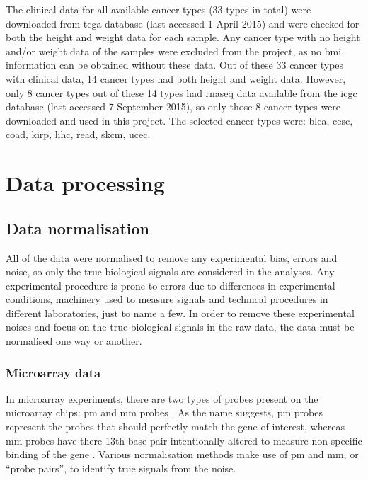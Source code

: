 \noindent
The clinical data for all available cancer types (33 types in total) were downloaded from \gls{tcga} database (last accessed 1 April 2015) and were checked for both the height and weight data for each sample.
Any cancer type with no height and/or weight data of the samples were excluded from the project, as no \gls{bmi} information can be obtained without these data.
Out of these 33 cancer types with clinical data, 14 cancer types had both height and weight data.
However, only 8 cancer types out of these 14 types had \gls{rnaseq} data available from the \gls{icgc} database (last accessed 7 September 2015), so only those 8 cancer types were downloaded and used in this project.
The selected cancer types were: \gls{blca}, \gls{cesc}, \gls{coad}, \gls{kirp}, \gls{lihc}, \gls{read}, \gls{skcm}, \gls{ucec}.

\section{Data processing}
\label{sec:datproc}

\subsection{Data normalisation}
\label{sub:data_normalisation}

All of the data were normalised to remove any experimental bias, errors and noise, so only the true biological signals are considered in the analyses.
Any experimental procedure is prone to errors due to differences in experimental conditions, machinery used to measure signals and technical procedures in different laboratories, just to name a few.
In order to remove these experimental noises and focus on the true biological signals in the raw data, the data must be normalised one way or another.

\subsubsection{Microarray data}
\label{ssub:microarray_data}

In microarray experiments, there are two types of probes present on the microarray chips: \gls{pm} and \gls{mm} probes \citep{Irizarry2003}.
As the name suggests, \gls{pm} probes represent the probes that should perfectly match the gene of interest, whereas \gls{mm} probes have there 13th base pair intentionally altered to measure non-specific binding of the gene \citep{Irizarry2003}.
Various normalisation methods make use of \gls{pm} and \gls{mm}, or ``probe pairs'', to identify true signals from the noise.

